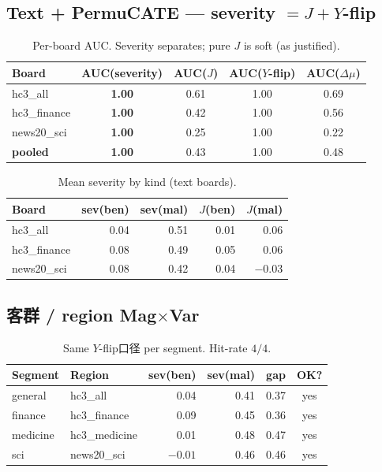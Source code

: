 \documentclass[11pt]{article}
\begin{document}
\subsection{Text + PermuCATE --- severity $=J+Y$-flip}
\begin{table}[h]
\centering
\caption{Per-board AUC. Severity separates; pure $J$ is soft (as justified).}
\label{tab:tokauc}
\small
\begin{tabular}{@{}lcccc@{}}
\toprule
Board & AUC(severity) & AUC($J$) & AUC($Y$-flip) & AUC($\Delta\mu$) \\
\midrule
hc3\_all & \textbf{1.00} & 0.61 & 1.00 & 0.69 \\
hc3\_finance & \textbf{1.00} & 0.42 & 1.00 & 0.56 \\
news20\_sci & \textbf{1.00} & 0.25 & 1.00 & 0.22 \\
\midrule
\textbf{pooled} & \textbf{1.00} & 0.43 & 1.00 & 0.48 \\
\bottomrule
\end{tabular}
\end{table}

\begin{table}[h]
\centering
\caption{Mean severity by kind (text boards).}
\label{tab:tokmean}
\small
\begin{tabular}{@{}lrrrr@{}}
\toprule
Board & sev(ben) & sev(mal) & $J$(ben) & $J$(mal) \\
\midrule
hc3\_all & 0.04 & 0.51 & 0.01 & 0.06 \\
hc3\_finance & 0.08 & 0.49 & 0.05 & 0.06 \\
news20\_sci & 0.08 & 0.42 & 0.04 & $-0.03$ \\
\bottomrule
\end{tabular}
\end{table}

\subsection{客群 / region Mag$\times$Var}
\begin{table}[h]
\centering
\caption{Same $Y$-flip口径 per segment. Hit-rate $4/4$.}
\label{tab:seg}
\small
\begin{tabular}{@{}llrrr c@{}}
\toprule
Segment & Region & sev(ben) & sev(mal) & gap & OK? \\
\midrule
general & hc3\_all & 0.04 & 0.41 & 0.37 & yes \\
finance & hc3\_finance & 0.09 & 0.45 & 0.36 & yes \\
medicine & hc3\_medicine & 0.01 & 0.48 & 0.47 & yes \\
sci & news20\_sci & $-0.01$ & 0.46 & 0.46 & yes \\
\bottomrule
\end{tabular}
\end{table}
\end{document}
